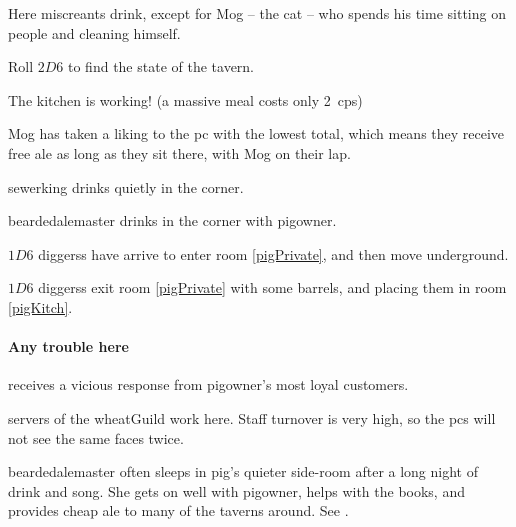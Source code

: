 \begin{multicols}{2}


Here miscreants drink, except for Mog -- the cat -- who spends his time sitting on people and cleaning himself.

Roll $2D6$ to find the state of the tavern.

\begin{dlist}
  \item
  The kitchen is working!
  (a massive meal costs only 2~\glspl{cp})
  \item
  Mog has taken a liking to the \gls{pc} with the lowest  total, which means they receive free ale as long as they sit there, with Mog on their lap.
  \item
  \Gls{sewerking} drinks quietly in the corner.
  \item
  \Gls{beardedalemaster} drinks in the corner with \gls{pigowner}.
  \item
  $1D6$ \glspl{diggers} have arrive to enter room \vref{pigPrivate}, and then move underground.
  \item
  $1D6$ \glspl{diggers} exit room \ref{pigPrivate} with some barrels, and placing them in room \vref{pigKitch}.
\end{dlist}

\paragraph{Any trouble here}
receives a vicious response from \gls{pigowner}'s most loyal customers.


\pigowner


\Glspl{server} of the \gls{wheatGuild} work here.
Staff turnover is very high, so the \glspl{pc} will not see the same faces twice.


\Gls{beardedalemaster} often sleeps in \gls{pig}'s quieter side-room after a long night of drink and song.
She gets on well with \gls{pigowner}, helps with the books, and provides cheap ale to many of the taverns around.
See .


\end{multicols}

